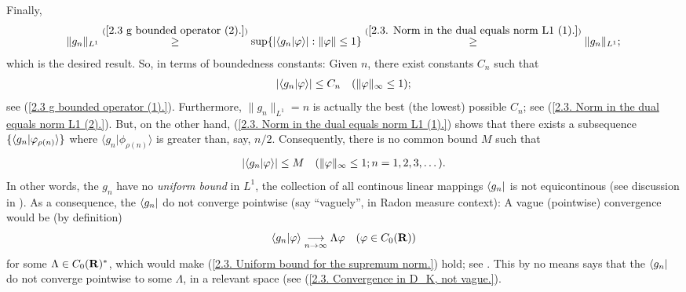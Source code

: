 %
Finally, %
%
  \begin{align}\label{2.3. Norm in the dual equals norm L1 (2).}
    \| g_n\|_{L^{1}}
      \overset{(\ref{2.3  g  bounded operator (2).})}{\geq}
    \sup\{
    \left\lvert \bra{g_n}\ket{\varphi} \right\rvert
    : 
      \| \varphi \| \leq 1
    \} 
      \overset{(\ref{2.3. Norm in the dual equals norm L1 (1).})}{\geq} 
    \| g_n\|_{L^{1}};
  \end{align}  %
%
which is the desired result. %
%
So, in terms of boundedness constants: %
Given $n$, there exist constants $C_{n}$ such that 
    \begin{align}\label{2.3. Optimal bound.}
      \left\lvert 
        \bra{g_n}\ket{\varphi} 
      \right\rvert 
        \leq 
      C_{n} \quad (\| \varphi \|_\infty \leq 1); 
    \end{align}
see (\ref{2.3  g  bounded operator (1).}). 
Furthermore, %
%
  $\|g_n\|_{L^1} = n$ is actually the best (the lowest) possible $C_{n}$; see %
    (\ref{2.3. Norm in the dual equals norm L1 (2).}). %
But, on the other hand, %
%
  (\ref{2.3. Norm in the dual equals norm L1 (1).}) %
%
shows that there exists a subsequence %
%
  $\{\langle{g_n}\lvert{\varphi_{\rho(n)}}\rangle\}$ %
%
where %
%
  $\langle{g_n}\lvert{\phi_{\rho(n)}}\rangle$ %
% 
is greater than, say, $n/2$. %
%
Consequently, there is no common bound $M$ such that %
%
  \begin{align}\label{2.3. Uniform bound for the supremum norm.}
    \left\lvert 
      \bra{g_n}\ket{\varphi} 
    \right\rvert 
      \leq M
    \quad (\| \varphi \|_\infty \leq 1; n=1, 2, 3, \dots).
  \end{align}
%
In other words, the $g_n$ have no \textit{uniform bound} in ${L^1}$, %
  \ie %
the collection of all continous linear mappings %
%
  $\bra{g_n}$ %
%
is not equicontinous %
%
  (see discussion in ). %
%
As a consequence, %
%
  the $\bra{g_n}$ %
%
do not converge pointwise (say ``vaguely'', in Radon measure context): %
A vague (\ie pointwise) convergence would be (by definition) %
%
  \begin{align}
    \bra{g_n}\ket{\phi} \tendsto{n}{\infty} \Lambda \phi %
    \quad (\phi \in C_0(\R)) %
  \end{align}
%
for some $\Lambda\in C_0({\mathbf R})^\ast$, which would make %
%
  (\ref{2.3. Uniform bound for the supremum norm.})
%
hold; see . %
%
This by no means says that the %
%
  $\bra{g_n}$ %
%
do not converge pointwise to some $\Lambda$, in a relevant space (see %
%
  (\ref{2.3. Convergence in D_K, not vague.}). %
%
\newline\newline\noindent
